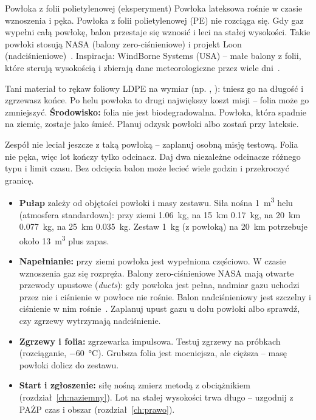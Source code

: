\begin{sekcja}{Powłoka z folii polietylenowej (eksperyment)}\label{sec:ldpe}
Powłoka lateksowa rośnie w czasie wznoszenia i pęka. Powłoka z folii polietylenowej (PE) nie rozciąga się. Gdy gaz wypełni całą powłokę, balon przestaje się wznosić i leci na stałej wysokości. Takie powłoki stosują NASA (balony zero-ciśnieniowe) i projekt Loon (nadciśnieniowe)~\cite{nasahb,loon}. Inspiracja: WindBorne Systems (USA) -- małe balony z folii, które sterują wysokością i zbierają dane meteorologiczne przez wiele dni~\cite{windborne}.

Tani materiał to rękaw foliowy LDPE na wymiar (np. , ): tniesz go na długość i zgrzewasz końce. Po helu powłoka to drugi największy koszt misji -- folia może go zmniejszyć. \textbf{Środowisko:} folia nie jest biodegradowalna. Powłoka, która spadnie na ziemię, zostaje jako śmieć. Planuj odzysk powłoki albo zostań przy lateksie.

\begin{uwaga}Zespół nie leciał jeszcze z taką powłoką -- zaplanuj osobną misję testową. Folia nie pęka, więc lot kończy tylko odcinacz. Daj dwa niezależne odcinacze różnego typu i limit czasu. Bez odcięcia balon może lecieć wiele godzin i przekroczyć granicę.\end{uwaga}

\begin{itemize}\setlength\itemsep{1pt}
  \item \textbf{Pułap} zależy od objętości powłoki i masy zestawu. Siła nośna \SI{1}{m^3} helu (atmosfera standardowa): przy ziemi \SI{1.06}{kg}, na \SI{15}{km} \SI{0.17}{kg}, na \SI{20}{km} \SI{0.077}{kg}, na \SI{25}{km} \SI{0.035}{kg}. Zestaw \SI{1}{kg} (z powłoką) na \SI{20}{km} potrzebuje około \SI{13}{m^3} plus zapas.
  \item \textbf{Napełnianie:} przy ziemi powłoka jest wypełniona częściowo. W czasie wznoszenia gaz się rozpręża. Balony zero-ciśnieniowe NASA mają otwarte przewody upustowe (\emph{ducts}): gdy powłoka jest pełna, nadmiar gazu uchodzi przez nie i ciśnienie w powłoce nie rośnie. Balon nadciśnieniowy jest szczelny i ciśnienie w nim rośnie~\cite{nasatypes}. Zaplanuj upust gazu u dołu powłoki albo sprawdź, czy zgrzewy wytrzymają nadciśnienie.
  \item \textbf{Zgrzewy i folia:} zgrzewarka impulsowa. Testuj zgrzewy na próbkach (rozciąganie, \SI{-60}{\degreeCelsius}). Grubsza folia jest mocniejsza, ale cięższa -- masę powłoki dolicz do zestawu.
  \item \textbf{Start i zgłoszenie:} siłę nośną zmierz metodą z obciążnikiem (rozdział~\ref{ch:naziemny}). Lot na stałej wysokości trwa długo -- uzgodnij z PAŻP czas i obszar (rozdział~\ref{ch:prawo}).
\end{itemize}

\end{sekcja}

